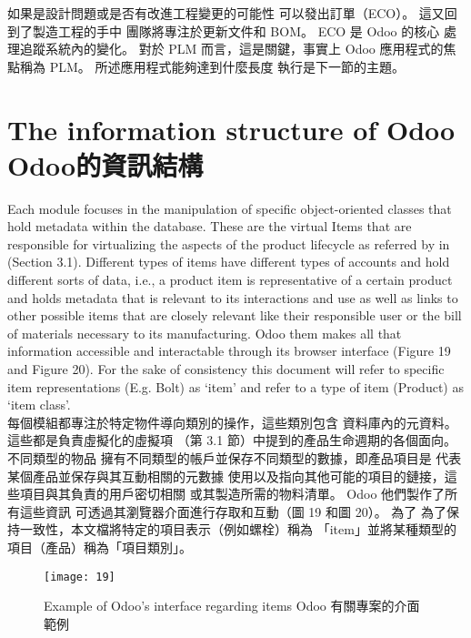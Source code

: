 \fontsize{12}{2.5pt}\sectionef  
{如果是設計問題或是否有改進工程變更的可能性
可以發出訂單（ECO）。 這又回到了製造工程的手中
團隊將專注於更新文件和 BOM。 ECO 是 Odoo 的核心
處理追蹤系統內的變化。 對於 PLM 而言，這是關鍵，事實上
Odoo 應用程式的焦點稱為 PLM。 所述應用程式能夠達到什麼長度
執行是下一節的主題。}
\\[15pt]

\section{The information structure of Odoo Odoo的資訊結構 }

\fontsize{12}{2.5pt}\sectionef 
 {Each module focuses in the manipulation of specific object-oriented classes that hold
metadata within the database. These are the virtual Items that are responsible for virtualizing
the aspects of the product lifecycle as referred by in (Section 3.1). Different types of items
have different types of accounts and hold different sorts of data, i.e., a product item is
representative of a certain product and holds metadata that is relevant to its interactions and
use as well as links to other possible items that are closely relevant like their responsible user
or the bill of materials necessary to its manufacturing. Odoo them makes all that information
accessible and interactable through its browser interface (Figure 19 and Figure 20). For the
sake of consistency this document will refer to specific item representations (E.g. Bolt) as
‘item’ and refer to a type of item (Product) as ‘item class’.}\\[1pt]

\fontsize{12}{2.5pt}\sectionef  
{每個模組都專注於特定物件導向類別的操作，這些類別包含
資料庫內的元資料。 這些都是負責虛擬化的虛擬項
（第 3.1 節）中提到的產品生命週期的各個面向。 不同類型的物品
擁有不同類型的帳戶並保存不同類型的數據，即產品項目是
代表某個產品並保存與其互動相關的元數據
使用以及指向其他可能的項目的鏈接，這些項目與其負責的用戶密切相關
或其製造所需的物料清單。 Odoo 他們製作了所有這些資訊
可透過其瀏覽器介面進行存取和互動（圖 19 和圖 20）。 為了
為了保持一致性，本文檔將特定的項目表示（例如螺栓）稱為
「item」並將某種類型的項目（產品）稱為「項目類別」。}\\[15pt]

\begin{figure}[hbt!]
\begin{center}
\texttt{[image: 19]}
\caption{\Large Example of Odoo’s interface regarding items Odoo 有關專案的介面範例}\label{fig.19}
\end{center}
\end{figure}

